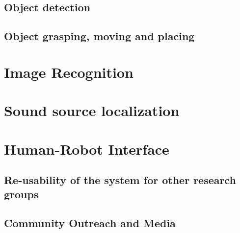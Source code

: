 \documentclass[runningheads,a4paper]{llncs}
\begin{document}
\subsection{Object detection}


\subsection{Object grasping, moving and placing}


\section{Image Recognition}


\section{Sound source localization}


%

\section{Human-Robot Interface}


%

%

\subsection{Re-usability of the system for other research groups}


\subsection{Community Outreach and Media}

\end{document}
